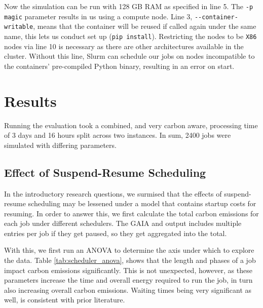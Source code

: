 Now the simulation can be run with 128 GB RAM as specified in line 5. 
The \verb|-p magic| parameter results in us using a compute node. 
Line 3, \verb|--container-writable|, means that the container will be reused if called again under the same name, this lets us conduct set up  (\verb|pip install|).
Restricting the nodes to be \verb|X86| nodes via line 10 is necessary as there are other architectures available in the cluster. 
Without this line, Slurm can schedule our jobs on nodes incompatible to the containers' pre-compiled Python binary, resulting in an error on start.

\section{Results}

Running the evaluation took a combined, and very carbon aware, processing time of 3 days and 16 hours split across two instances.
In sum, 2400 jobs were simulated with differing parameters. 

\subsection{Effect of Suspend-Resume Scheduling}

In the introductory research questions, we surmised that the effects of suspend-resume scheduling may be lessened under a model that contains startup costs for resuming. 
In order to answer this, we first calculate the total carbon emissions for each job under different schedulers. The GAIA and \programname{} output includes multiple entries per job if they get paused, so they get aggregated into the total.

With this, we first run an ANOVA to determine the axis under which to explore the data. Table \ref{tab:scheduler_anova}, shows that the length and phases of a job impact carbon emissions significantly.
This is not unexpected, however, as these parameters increase the time and overall energy required to run the job, in turn also increasing overall carbon emissions.
Waiting times being very significant as well, is consistent with prior literature\cite{wiesner_lets_2021}.

